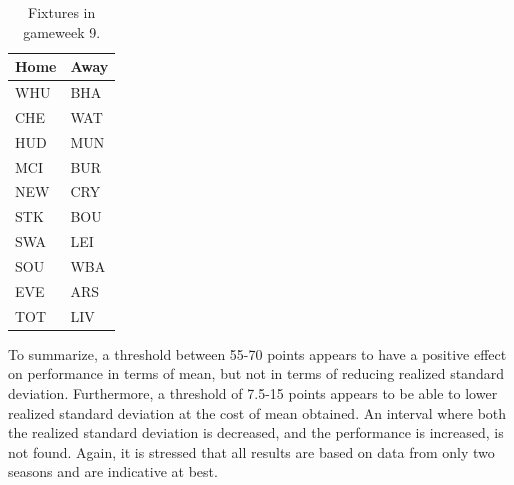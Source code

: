 \begin{table}[H]
\centering
\begin{tabular}{@{}ll@{}}
\toprule
Home & Away \\ \midrule
WHU  & BHA  \\
CHE  & WAT  \\
HUD  & MUN  \\
MCI  & BUR  \\
NEW  & CRY  \\
STK  & BOU  \\
SWA  & LEI  \\
SOU  & WBA  \\
EVE  & ARS  \\
TOT  & LIV  \\ \bottomrule
\end{tabular}
\caption{Fixtures in gameweek 9.}
\label{tab:fixtures_gw9}
\end{table}

To summarize, a threshold between 55-70 points appears to have a positive effect on performance in terms of mean, but not in terms of reducing realized standard deviation. Furthermore, a threshold of 7.5-15 points appears to be able to lower realized standard deviation at the cost of mean obtained. An interval where both the realized standard deviation is decreased, and the performance is increased, is not found. Again, it is stressed that all results are based on data from only two seasons and are indicative at best.